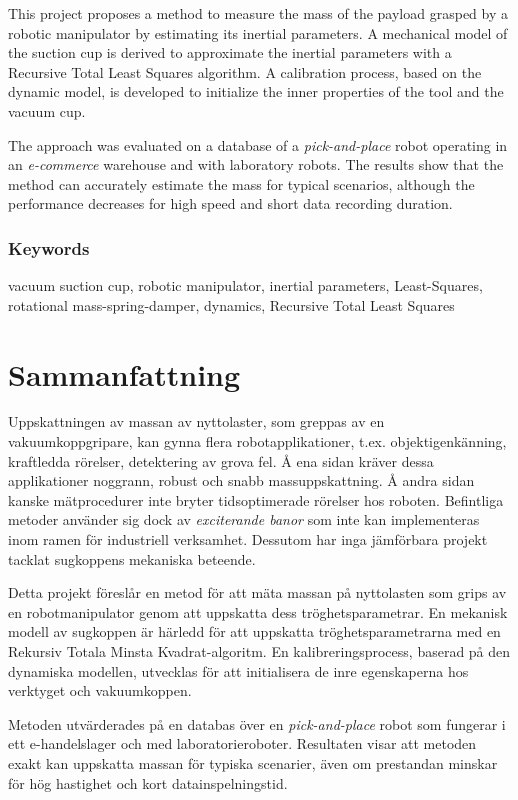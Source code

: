 \documentclass[/home/francois/latex/report/main.tex]{subfiles}
\begin{document}
This project proposes a method to measure the mass of the payload grasped by a robotic manipulator by estimating its inertial parameters. A mechanical model of the suction cup is derived to approximate the inertial parameters with a Recursive Total Least Squares algorithm. A calibration process, based on the dynamic model, is developed to initialize the inner properties of the tool and the vacuum cup.

The approach was evaluated on a database of a \textit{pick-and-place} robot operating in an \textit{e-commerce} warehouse and with laboratory robots. The results show that the method can accurately estimate the mass for typical scenarios, although the performance decreases for high speed and short data recording duration.

\subsection*{Keywords}

vacuum suction cup, robotic manipulator, inertial parameters, Least-Squares, rotational mass-spring-damper, dynamics, Recursive Total Least Squares

\newpage
\thispagestyle{plain}

\chapter*{Sammanfattning}

Uppskattningen av massan av nyttolaster, som greppas av en vakuumkoppgripare, kan gynna flera robotapplikationer, t.ex. objektigenkänning, kraftledda rörelser, detektering av grova fel. Å ena sidan kräver dessa applikationer noggrann, robust och snabb massuppskattning. Å andra sidan kanske mätprocedurer inte bryter tidsoptimerade rörelser hos roboten. Befintliga metoder använder sig dock av \textit{exciterande banor} som inte kan implementeras inom ramen för industriell verksamhet. Dessutom har inga jämförbara projekt tacklat sugkoppens mekaniska beteende.

Detta projekt föreslår en metod för att mäta massan på nyttolasten som grips av en robotmanipulator genom att uppskatta dess tröghetsparametrar. En mekanisk modell av sugkoppen är härledd för att uppskatta tröghetsparametrarna med en Rekursiv Totala Minsta Kvadrat-algoritm. En kalibreringsprocess, baserad på den dynamiska modellen, utvecklas för att initialisera de inre egenskaperna hos verktyget och vakuumkoppen.

Metoden utvärderades på en databas över en \textit{pick-and-place} robot som fungerar i ett e-handelslager och med laboratorieroboter. Resultaten visar att metoden exakt kan uppskatta massan för typiska scenarier, även om prestandan minskar för hög hastighet och kort datainspelningstid.
\end{document}
